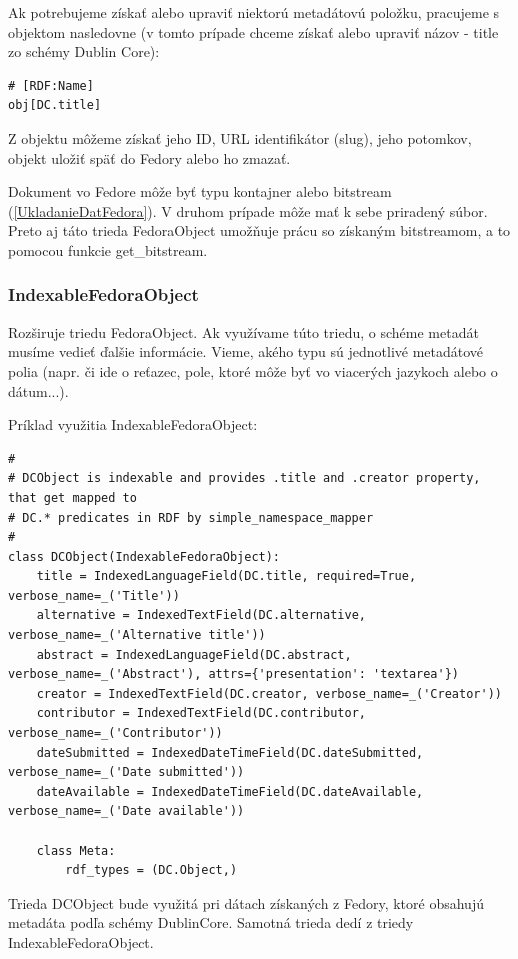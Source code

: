 \documentclass[thesis=M,slovak]{FITthesis}[2013/05/06]
\begin{document}
Ak potrebujeme získať alebo upraviť niektorú metadátovú položku, pracujeme s objektom nasledovne (v tomto prípade chceme získať alebo upraviť názov - title zo schémy Dublin Core): 
\begin{lstlisting}[frame=single] 
# [RDF:Name]
obj[DC.title]
\end{lstlisting}

Z objektu môžeme získať jeho ID, URL identifikátor (slug), jeho potomkov, objekt uložiť späť do Fedory alebo ho zmazať.

Dokument vo Fedore môže byť typu kontajner alebo bitstream (\ref{UkladanieDatFedora}). V druhom prípade môže mať k sebe priradený súbor. Preto aj táto trieda FedoraObject umožňuje prácu so získaným bitstreamom, a to pomocou funkcie get\_bitstream.

\subsubsection{IndexableFedoraObject}
Rozširuje triedu FedoraObject. Ak využívame túto triedu, o schéme metadát musíme vedieť ďalšie informácie. Vieme, akého typu sú jednotlivé metadátové polia (napr. či ide o reťazec, pole, ktoré môže byť vo viacerých jazykoch alebo o dátum...).

Príklad využitia IndexableFedoraObject:
\begin{lstlisting}[frame=single] 
#
# DCObject is indexable and provides .title and .creator property, that get mapped to
# DC.* predicates in RDF by simple_namespace_mapper
#
class DCObject(IndexableFedoraObject):
    title = IndexedLanguageField(DC.title, required=True, verbose_name=_('Title'))
    alternative = IndexedTextField(DC.alternative, verbose_name=_('Alternative title'))
    abstract = IndexedLanguageField(DC.abstract, verbose_name=_('Abstract'), attrs={'presentation': 'textarea'})
    creator = IndexedTextField(DC.creator, verbose_name=_('Creator'))
    contributor = IndexedTextField(DC.contributor, verbose_name=_('Contributor'))
    dateSubmitted = IndexedDateTimeField(DC.dateSubmitted, verbose_name=_('Date submitted'))
    dateAvailable = IndexedDateTimeField(DC.dateAvailable, verbose_name=_('Date available'))

    class Meta:
        rdf_types = (DC.Object,)
\end{lstlisting}

Trieda DCObject bude využitá pri dátach získaných z Fedory, ktoré obsahujú metadáta podľa schémy DublinCore. Samotná trieda dedí z triedy IndexableFedoraObject.
\end{document}
